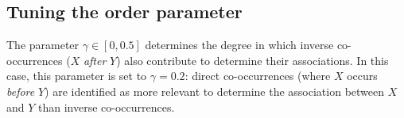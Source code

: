 

%



\subsection{Tuning the order parameter} %
\label{par:considering_different_orderings_}

The parameter $\gamma \in [0,0.5]$ determines the degree in which inverse co-occurrences ($X$ \emph{after} $Y$) also contribute to determine their associations.
%
In this case, this parameter is set to $\gamma = 0.2$: direct co-occurrences (where $X$ occurs \emph{before} $Y$) are identified as more relevant to determine the association between $X$ and $Y$ than inverse co-occurrences.

%


